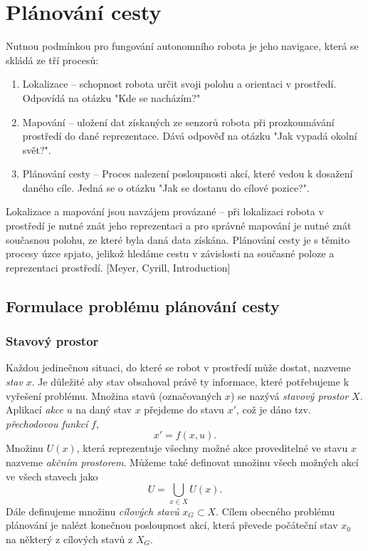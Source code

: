 
\chapter{Plánování cesty}
Nutnou podmínkou pro fungování autonomního robota je jeho navigace, která se skládá ze tří procesů:
\begin{enumerate}
	\item Lokalizace -- schopnost robota určit svoji polohu a orientaci v prostředí. Odpovídá na otázku "Kde se nacházím?"
	\item Mapování -- uložení dat získaných ze senzorů robota při prozkoumávání prostředí do dané reprezentace. Dává odpověď na otázku "Jak vypadá okolní svět?".
	\item Plánování cesty -- Proces nalezení posloupnosti akcí, které vedou k dosažení daného cíle. Jedná se o otázku "Jak se dostanu do cílové pozice?".
\end{enumerate}
Lokalizace a mapování jsou navzájem provázané -- při lokalizaci robota v prostředí je nutné znát jeho reprezentaci a pro správné mapování je nutné znát současnou polohu, ze které byla daná data získána. Plánování cesty je s těmito procesy úzce spjato, jelikož hledáme cestu v závislosti na současné poloze a reprezentaci prostředí. [Meyer, Cyrill, Introduction]

\section{Formulace problému plánování cesty}
\subsection{Stavový prostor}
Každou jedinečnou situaci, do které se robot v prostředí může dostat, nazveme \emph{stav} $x$. Je důležité aby stav obsahoval právě ty informace, které potřebujeme k vyřešení problému. Množina stavů (označovaných $x$) se nazývá \emph{stavový prostor} $X$. Aplikací \emph{akce} $u$ na daný stav $x$ přejdeme do stavu $x'$, což je dáno tzv. \emph{přechodovou funkcí} $f$,
\begin{equation}
x'=f\left(x,u\right).
\end{equation}
Množinu $U(x)$, která reprezentuje všechny možné akce proveditelné ve stavu $x$ nazveme \emph{akčním prostorem}. Můžeme také definovat množinu všech možných akcí ve všech stavech jako
\begin{equation}
U=\bigcup_{x \in X} U(x).
\end{equation}
Dále definujeme množinu \emph{cílových stavů} $x_G \subset X$. Cílem obecného problému plánování je nalézt konečnou posloupnost akcí, která převede počáteční stav $x_0$ na některý z cílových stavů z $X_G$. 

